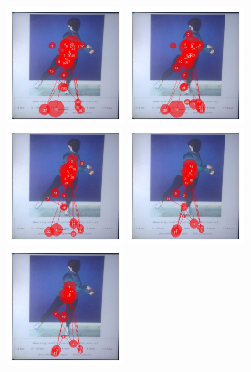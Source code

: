 \documentclass[11pt]{asaproc}
\begin{document}
\begin{figure}[t]
\begin{center}
\includegraphics[width=0.30\textwidth]{figures/Subject13_scanpath_posture17_lambda_3.jpg} \hspace{1pt}
\includegraphics[width=0.30\textwidth]{figures/Subject13_scanpath_posture17_lambda_5.jpg} \\
\includegraphics[width=0.30\textwidth]{figures/Subject13_scanpath_posture17_lambda_8.jpg} \hspace{1pt}
\includegraphics[width=0.30\textwidth]{figures/Subject13_scanpath_posture17_lambda_10.jpg} \\
\includegraphics[width=0.30\textwidth]{figures/Subject13_scanpath_posture17_lambda_12.jpg} \hspace{1pt}

\end{center}
\end{figure}
\end{document}
